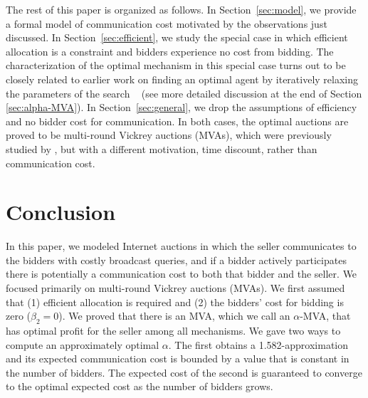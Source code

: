 \documentclass{aamas2013}
\begin{document}
The rest of this paper is organized as follows.  In Section~\ref{sec:model}, we
provide a formal model of communication cost motivated by the observations just
discussed.  In Section~\ref{sec:efficient}, we study the special case in which
efficient allocation is a constraint and bidders experience no cost from
bidding.  The characterization of the optimal mechanism in this special case
turns out to be closely related to earlier work on finding an optimal agent by
iteratively relaxing the parameters of the search
~\cite{SarneSR2010:IncreasingSearch} (see more detailed discussion at
the end of Section \ref{sec:alpha-MVA}).  In Section~\ref{sec:general}, we drop
the assumptions of efficiency and no bidder cost for communication. In both
cases, the optimal auctions are proved to be multi-round Vickrey auctions (MVAs),
which were previously studied by \cite{McAfee97:SequentialAuctions}, but with a
different motivation, time discount, rather than communication cost. 














\section{Conclusion}
In this paper, we modeled Internet auctions in which the seller communicates to
the bidders with costly broadcast queries, and if a bidder actively
participates there is potentially a communication cost to both that bidder and
the seller.  We focused primarily on multi-round Vickrey auctions (MVAs).  We
first assumed that (1) efficient allocation is required and (2) the bidders'
cost for bidding is zero ($\beta_2 = 0$). We proved that there is an MVA, which
we call an $\alpha$-MVA, that has optimal profit for the seller among all
mechanisms.  We gave two ways to compute an approximately optimal $\alpha$.
The first obtains a 1.582-approximation and its expected communication cost is
bounded by a value that is constant in the number of bidders. The expected cost
of the second is guaranteed to converge to the optimal expected cost as the
number of bidders grows.
\end{document}
